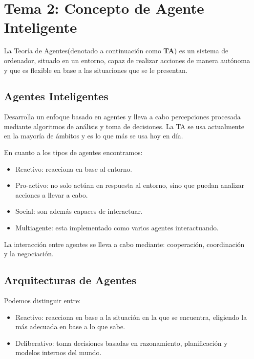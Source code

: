 \section{Tema 2: Concepto de Agente Inteligente}

La Teoría de Agentes(denotado a continuación como \textbf{TA}) es un sistema de ordenador, situado en un entorno, capaz de realizar acciones de manera autónoma y que es flexible en base a las situaciones que se le presentan.

\subsection{Agentes Inteligentes}

Desarrolla un enfoque basado en agentes y lleva a cabo percepciones procesada mediante algoritmos de análisis y toma de decisiones. 
La TA se usa actualmente en la mayoría de ámbitos y es lo que más se usa hoy en día.

En cuanto a los tipos de agentes encontramos:

\begin{itemize}
    \item Reactivo: reacciona en base al entorno.
    \item Pro-activo: no solo actúan en respuesta al entorno, sino que puedan analizar acciones a llevar a cabo.
    \item  Social: son además capaces de interactuar.
    \item Multiagente: esta implementado como varios agentes interactuando.
\end{itemize}

La interacción entre agentes se lleva a cabo mediante: cooperación, coordinación y la negociación.


\subsection{Arquitecturas de Agentes}

Podemos distinguir entre:

\begin{itemize}
    \item Reactivo: reacciona en base a la situación en la que se encuentra, eligiendo la más adecuada en base a lo que sabe.
    \item Deliberativo: toma decisiones basadas en razonamiento, planificación y modelos internos del mundo.
\end{itemize}


